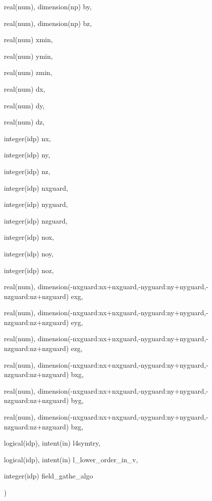 {\begin{DoxyParamCaption}
\item[{real(num), dimension(np)}]{by, }
\item[{real(num), dimension(np)}]{bz, }
\item[{real(num)}]{xmin, }
\item[{real(num)}]{ymin, }
\item[{real(num)}]{zmin, }
\item[{real(num)}]{dx, }
\item[{real(num)}]{dy, }
\item[{real(num)}]{dz, }
\item[{integer(idp)}]{nx, }
\item[{integer(idp)}]{ny, }
\item[{integer(idp)}]{nz, }
\item[{integer(idp)}]{nxguard, }
\item[{integer(idp)}]{nyguard, }
\item[{integer(idp)}]{nzguard, }
\item[{integer(idp)}]{nox, }
\item[{integer(idp)}]{noy, }
\item[{integer(idp)}]{noz, }
\item[{real(num), dimension(-\/nxguard\+:nx+nxguard,-\/nyguard\+:ny+nyguard,-\/nzguard\+:nz+nzguard)}]{exg, }
\item[{real(num), dimension(-\/nxguard\+:nx+nxguard,-\/nyguard\+:ny+nyguard,-\/nzguard\+:nz+nzguard)}]{eyg, }
\item[{real(num), dimension(-\/nxguard\+:nx+nxguard,-\/nyguard\+:ny+nyguard,-\/nzguard\+:nz+nzguard)}]{ezg, }
\item[{real(num), dimension(-\/nxguard\+:nx+nxguard,-\/nyguard\+:ny+nyguard,-\/nzguard\+:nz+nzguard)}]{bxg, }
\item[{real(num), dimension(-\/nxguard\+:nx+nxguard,-\/nyguard\+:ny+nyguard,-\/nzguard\+:nz+nzguard)}]{byg, }
\item[{real(num), dimension(-\/nxguard\+:nx+nxguard,-\/nyguard\+:ny+nyguard,-\/nzguard\+:nz+nzguard)}]{bzg, }
\item[{logical(idp), intent(in)}]{l4symtry, }
\item[{logical(idp), intent(in)}]{l\+\_\+lower\+\_\+order\+\_\+in\+\_\+v, }
\item[{integer(idp)}]{field\+\_\+gathe\+\_\+algo}
\end{DoxyParamCaption}
)}\hypertarget{field__gathering__2d_8_f90_a5c6ac50abbe5706b3f8f33afa68a23a5}{}\label{field__gathering__2d_8_f90_a5c6ac50abbe5706b3f8f33afa68a23a5}


